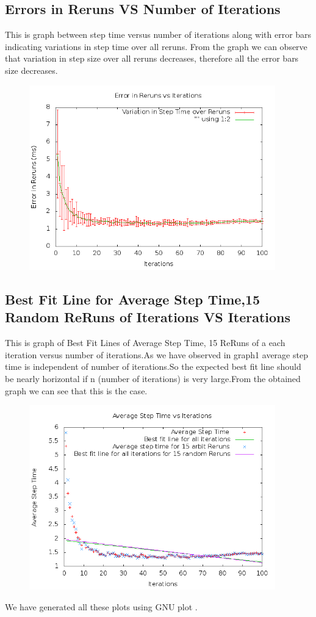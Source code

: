 \documentclass[11pt]{article}
\begin{document}
\subsection{Errors in Reruns VS Number of Iterations}
This is graph between step time versus number of iterations along with error bars indicating variations in step time over all reruns.
From the graph we can observe that variation in step size over all reruns decreases, therefore all the error bars size decreases.
\begin{figure}[H]
\centering
\includegraphics[height=8cm]{g23_plot03.png}
\end{figure}

\subsection{Best Fit Line for Average Step Time,15 Random ReRuns of Iterations VS Iterations}
This is graph of Best Fit Lines of Average Step Time, 15 ReRuns of a each iteration versus number of iterations.As we have observed in graph1 average step time is independent of number of iterations.So the expected best fit line should be nearly horizontal if n (number of iterations) is very large.From the obtained graph we can see that this is the case.
\begin{figure}[H]
\centering
\includegraphics[height=8cm]{g23_plot04.png}
\end{figure}
We have generated all these plots using GNU plot 
\cite{gnu}.
\end{document}
